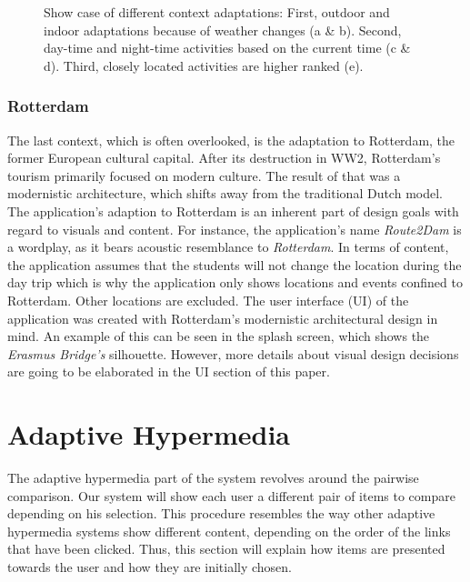 \documentclass[11pt,a4paper,oneside]{article}
\begin{document}
\begin{figure}[H]
    \caption{Show case of different context adaptations: First, outdoor and indoor adaptations because of weather changes (a \& b). Second, day-time and night-time activities based on the current time (c \& d). Third, closely located activities are higher ranked (e). 
    }%
    \label{fig:adaptions}%
\end{figure}

\subsubsection{Rotterdam}
The last context, which is often overlooked, is the adaptation to Rotterdam, the former European cultural capital.\cite{hitters_SocialPoliticalConstruction_2000} After its destruction in WW2, Rotterdam's tourism primarily focused on modern culture.\cite{rotterdam} The result of that was a modernistic architecture, which shifts away from the traditional Dutch model. The application's adaption to Rotterdam is an inherent part of design goals with regard to visuals and content. For instance, the application's name \emph{Route2Dam} is a wordplay, as it bears acoustic resemblance to \emph{Rotterdam}. In terms of content, the application assumes that the students will not change the location during the day trip which is why the application only shows locations and events confined to Rotterdam. Other locations are excluded. The user interface (UI) of the application was created with Rotterdam's modernistic architectural design in mind. An example of this can be seen in the splash screen, which shows the \emph{Erasmus Bridge's} silhouette. However, more details about visual design decisions are going to be elaborated in the UI section of this paper.

\section{Adaptive Hypermedia}
\label{sec:adaptive_hm}
The adaptive hypermedia part of the system revolves around the pairwise comparison. Our system will show each user a different pair of items to compare depending on his selection. This procedure resembles the way other adaptive hypermedia systems show different content, depending on the order of the links that have been clicked. Thus, this section will explain how items are presented towards the user and how they are initially chosen. 
\end{document}
